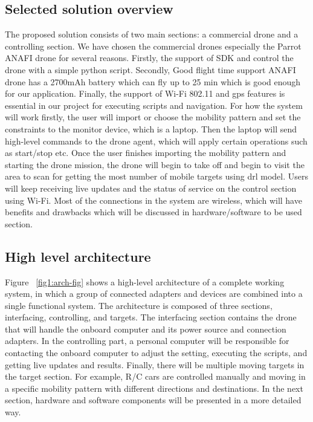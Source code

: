 \documentclass[../main.tex]{subfiles}
\begin{document}
\subsection{Selected solution overview}
The proposed solution consists of two main sections: a commercial drone and a controlling section.
We have chosen the commercial drones especially the Parrot ANAFI drone for several reasons.
Firstly, the support of SDK and control the drone with a simple python script.
Secondly, Good flight time support ANAFI drone has a 2700mAh battery which can fly up to 25 min which is good enough for our application.
Finally, the support of Wi-Fi 802.11 and \gls{gps} features is essential in our project for executing scripts and navigation. 
For how the system will work firstly, the user will import or choose the mobility pattern and set the constraints to the monitor device, which is a laptop.
Then the laptop will send high-level commands to the drone agent, which will apply certain operations such as start/stop etc.
Once the user finishes importing the mobility pattern and starting the drone mission, the drone will begin to take off and begin to visit the area to scan for getting the most number of mobile targets using \gls{drl} model.
Users will keep receiving live updates and the status of service on the control section using Wi-Fi.
Most of the connections in the system are wireless, which will have benefits and drawbacks which will be discussed in hardware/software to be used section.

\newpage
\subsection{High level architecture}
Figure ~\ref{fig1:arch-fig} shows a high-level architecture of a complete working system, in which a group of connected adapters and devices are combined into a single functional system. The architecture is composed of three sections, interfacing, controlling, and targets. The interfacing section contains the drone that will handle the onboard computer and its power source and connection adapters. In the controlling part, a personal computer will be responsible for contacting the onboard computer to adjust the setting, executing the scripts, and getting live updates and results. Finally, there will be multiple moving targets in the target section. For example, R/C cars are controlled manually and moving in a specific mobility pattern with different directions and destinations. In the next section, hardware and software components will be presented in a more detailed way.
\end{document}
